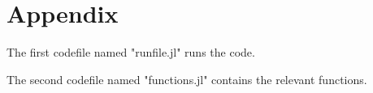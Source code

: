 \documentclass[landscape]{article} %
\theoremstyle{definition}
\begin{document}
\begin{enumerate}
%
%

\end{enumerate}

\section*{Appendix}
	The first codefile named "runfile.jl" runs the code.
	
	The second codefile named "functions.jl" contains the relevant functions.
\end{document}
